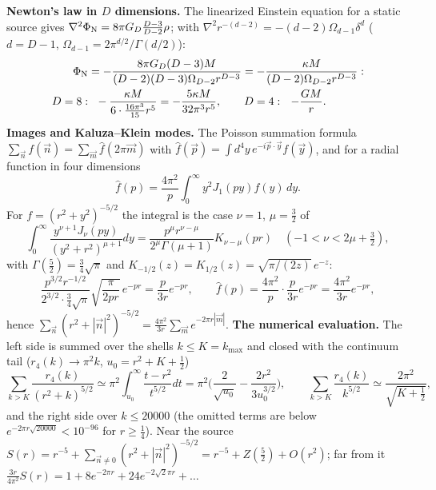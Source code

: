 \documentclass[10pt,a4paper]{article}
\begin{document}
\textbf{Newton’s law in $D$ dimensions.} The linearized Einstein equation for a static source gives $\nabla^2\Phi_{\rm N}=8\pi G_D\frac{D-3}{D-2}\rho$; with $\nabla^2r^{-(d-2)}=-(d-2)\Omega_{d-1}\delta^d$ ($d=D-1$, $\Omega_{d-1}=2\pi^{d/2}/\Gamma(d/2)$):
\begin{align*}
\Phi_{\rm N}&=-\frac{8\pi G_D(D-3)M}{(D-2)(D-3)\Omega_{D-2}r^{D-3}}=-\frac{\kappa M}{(D-2)\Omega_{D-2}r^{D-3}}: \\
D=8:&\ \ -\frac{\kappa M}{6\cdot\frac{16\pi^3}{15}r^5}=-\frac{5\kappa M}{32\pi^3r^5},\qquad D=4:\ \ -\frac{GM}r .
\end{align*}
\textbf{Images and Kaluza–Klein modes.} The Poisson summation formula $\sum_{\vec n}f(\vec n)=\sum_{\vec m}\hat f(2\pi\vec m)$ with $\hat f(\vec p)=\int d^4y\,e^{-i\vec p\cdot\vec y}f(\vec y)$, and for a radial function in four dimensions
\begin{equation*}
\hat f(p)=\frac{4\pi^2}p\int_0^\infty y^2J_1(py)f(y)\,dy .
\end{equation*}
For $f=(r^2+y^2)^{-5/2}$ the integral is the case $\nu=1$, $\mu=\frac32$ of
\begin{equation*}
\int_0^\infty\frac{y^{\nu+1}J_\nu(py)}{(y^2+r^2)^{\mu+1}}dy=\frac{p^\mu r^{\nu-\mu}}{2^\mu\Gamma(\mu+1)}K_{\nu-\mu}(pr)\quad(-1<\nu<2\mu+\tfrac32),
\end{equation*}
with $\Gamma(\frac52)=\frac34\sqrt\pi$ and $K_{-1/2}(z)=K_{1/2}(z)=\sqrt{\pi/(2z)}\,e^{-z}$:
\begin{equation*}
\frac{p^{3/2}r^{-1/2}}{2^{3/2}\cdot\frac34\sqrt\pi}\sqrt{\frac\pi{2pr}}\,e^{-pr}=\frac p{3r}e^{-pr},\qquad \hat f(p)=\frac{4\pi^2}p\cdot\frac p{3r}e^{-pr}=\frac{4\pi^2}{3r}e^{-pr},
\end{equation*}
hence $\sum_{\vec n}(r^2+|\vec n|^2)^{-5/2}=\frac{4\pi^2}{3r}\sum_{\vec m}e^{-2\pi r|\vec m|}$. \textbf{The numerical evaluation.} The left side is summed over the shells $k\le K=k_{\max}$ and closed with the continuum tail ($r_4(k)\to\pi^2k$, $u_0=r^2+K+\frac12$)
\begin{equation*}
\sum_{k>K}\frac{r_4(k)}{(r^2+k)^{5/2}}\simeq\pi^2\int_{u_0}^\infty\frac{t-r^2}{t^{5/2}}dt=\pi^2\Big(\frac2{\sqrt{u_0}}-\frac{2r^2}{3u_0^{3/2}}\Big),\qquad \sum_{k>K}\frac{r_4(k)}{k^{5/2}}\simeq\frac{2\pi^2}{\sqrt{K+\frac12}},
\end{equation*}
and the right side over $k\le20000$ (the omitted terms are below $e^{-2\pi r\sqrt{20000}}<10^{-96}$ for $r\ge\frac14$). Near the source $S(r)=r^{-5}+\sum_{\vec n\ne0}(r^2+|\vec n|^2)^{-5/2}=r^{-5}+Z(\frac52)+O(r^2)$; far from it $\frac{3r}{4\pi^2}S(r)=1+8e^{-2\pi r}+24e^{-2\sqrt2\pi r}+\dots$
\end{document}
